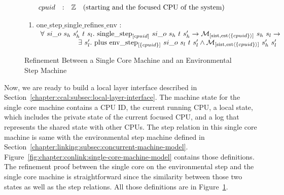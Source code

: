 \begin{figure}
\noindent{}
$$
\begin{array}{lllr}
cpuid & : & \ztype &  \mbox{(starting and the focused CPU of the system)}\\
\end{array}
$$

\noindent{}
\begin{mathpar}
\end{mathpar}

\noindent{}
\begin{enumerate}
\item one$\_$step$\_$single$\_$refines$\_$env : \\
$
\begin{array}{l}
\forall \ si\_o \ s_h \ s_h' \ t \ s_l . \ \singlestep{cpuid}{si\_o}{s_h}{t}{s_h'} \rightarrow  \matchsinglestatestate{\set{cpuid}}{s_h}{s_l} \rightarrow \\
\ \ \ \ \ \ \ \ \ \ \ \ \ \ \ \ \exists\ s_l' . \  \ccplusstep{\envstep{\set{cpuid}}{si\_o}{s_l}{t}{s_l'}} \wedge  \matchsinglestatestate{\set{cpuid}}{s_h'}{s_l'}\\
\end{array}
$
\end{enumerate}
\caption{Refinement Between a Single Core Machine and an Environmental Step Machine}
\label{fig:chapter:conlink:cpu-single-to-env-theorem}
\end{figure}

Now, we are ready to build a local layer interface described in Section~\ref{chapter:ccal:subsec:local-layer-interface}. 
The machine state for the single core machine contains 
a CPU ID, the current running CPU, 
a local state, which includes the private state of the current focused CPU,
and a log that represents the shared state with other CPUs. 
The step relation in this single core machine is same with the environmental step machine defined in Section~\ref{chapter:linking:subsec:concurrent-machine-model}. Figure~\ref{fig:chapter:conlink:single-core-machine-model} contains those definitions. 
The refinement proof between the single core on the environmental step and the single core machine is straightforward since the similarity between
those two states as well as the step relations.
All those definitions are in Figure~\ref{fig:chapter:conlink:cpu-single-to-env-theorem}.
